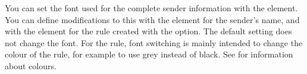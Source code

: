 \BeginIndexGroup
{}%
%
%
You can set the font used for the complete sender information with the
%
 element. You can define modifications to
this with the %
 element for the sender's name, and with the
%
 element for the rule created with the
 option. The default setting does not change the font. For
the rule, font switching is mainly intended to change the colour of the rule,
for example to use grey instead of black. See \cite{package:xcolor} for
information about colours.%
%
\EndIndexGroup

